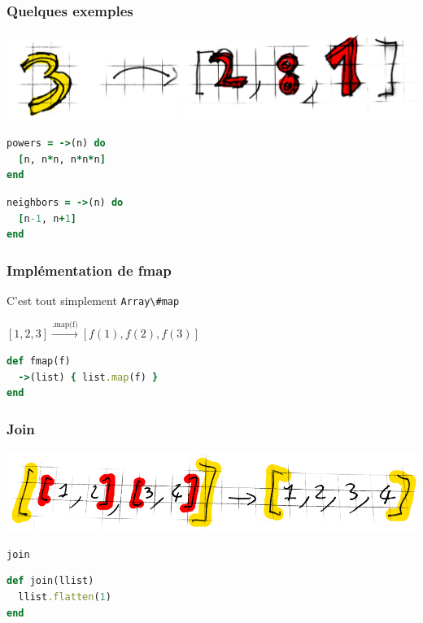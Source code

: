 \documentclass{beamer}
\begin{document}
\begin{frame}[fragile]
  \frametitle{Quelques exemples}
  \begin{center}
    \includegraphics[scale=0.2]{multiple-res.png}
  \end{center}
  \begin{block}{}
    \begin{lstlisting}[language=ruby]
powers = ->(n) do
  [n, n*n, n*n*n]
end
    \end{lstlisting}
  \end{block}
  \begin{block}{}
    \begin{lstlisting}[language=ruby]
neighbors = ->(n) do
  [n-1, n+1]
end
    \end{lstlisting}
  \end{block}
\end{frame}

\begin{frame}[fragile]
  \frametitle{Implémentation de fmap}
  \begin{exampleblock}{C'est tout simplement \verb!Array\#map!}
    \begin{center}
      $[1, 2, 3] {\xrightarrow{\text{.map(f)}}} [f(1), f(2), f(3)]$
    \end{center}
  \end{exampleblock}
  \medskip
  \begin{block}{}
    \begin{lstlisting}[language=ruby]
def fmap(f)
  ->(list) { list.map(f) }
end
    \end{lstlisting}  
  \end{block}
\end{frame}

\begin{frame}[fragile]
  \frametitle{Join}
  \begin{center}
    \includegraphics[scale=0.2]{flatten}
  \end{center}
  \begin{block}{\verb!join!}\begin{lstlisting}[language=ruby]
def join(llist)
  llist.flatten(1)
end
    \end{lstlisting}  
  \end{block}
\end{frame}
\end{document}
